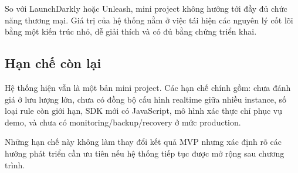 So với LaunchDarkly hoặc Unleash, mini project không hướng tới đầy đủ chức năng thương mại. Giá trị của hệ thống nằm ở việc tái hiện các nguyên lý cốt lõi bằng một kiến trúc nhỏ, dễ giải thích và có đủ bằng chứng triển khai.

\subsection{Hạn chế còn lại}

Hệ thống hiện vẫn là một bản mini project. Các hạn chế chính gồm: chưa đánh giá ở lưu lượng lớn, chưa có đồng bộ cấu hình realtime giữa nhiều instance, số loại rule còn giới hạn, SDK mới có JavaScript, mô hình xác thực chỉ phục vụ demo, và chưa có monitoring/backup/recovery ở mức production.

Những hạn chế này không làm thay đổi kết quả MVP nhưng xác định rõ các hướng phát triển cần ưu tiên nếu hệ thống tiếp tục được mở rộng sau chương trình.
